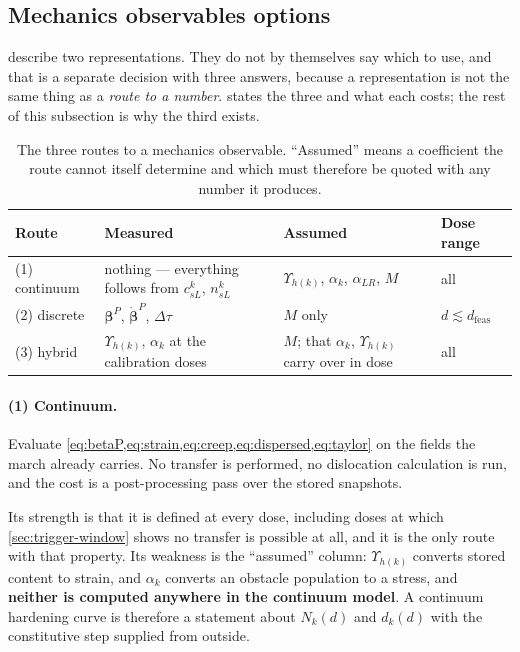 \documentclass{article}
\begin{document}
\subsection{Mechanics observables options}
\label{sec:obs-options}

 describe two representations. They do
not by themselves say which to use, and that is a separate decision with three
answers, because a representation is not the same thing as a \emph{route to a
number}.  states the three and what each costs; the rest of
this subsection is why the third exists.

\begin{table}[htbp]
\centering
\small
\caption{The three routes to a mechanics observable. ``Assumed'' means a
coefficient the route cannot itself determine and which must therefore be quoted
with any number it produces.}
\label{tab:obs-options}
\begin{tabularx}{\textwidth}{@{}l X X l@{}}
\toprule
Route & Measured & Assumed & Dose range \\
\midrule
(1) continuum &
nothing --- everything follows from $c^k_{sL}$, $n^k_{sL}$ &
$\Upsilon_{h(k)}$, $\alpha_k$, $\alpha_{LR}$, $M$ &
all \\
\addlinespace
(2) discrete &
$\bm\beta^{P}$, $\dot{\bm\beta}^{P}$, $\Delta\tau$ &
$M$ only &
$d\lesssim d_{\mathrm{feas}}$ \\
\addlinespace
(3) hybrid &
$\Upsilon_{h(k)}$, $\alpha_k$ at the calibration doses &
$M$; that $\alpha_k$, $\Upsilon_{h(k)}$ carry over in dose &
all \\
\bottomrule
\end{tabularx}
\end{table}

\paragraph{(1) Continuum.} Evaluate \cref{eq:betaP,eq:strain,eq:creep,eq:dispersed,eq:taylor}
on the fields the march already carries. No transfer is performed, no
dislocation calculation is run, and the cost is a post-processing pass over the
stored snapshots.

Its strength is that it is defined at every dose, including doses at which
\cref{sec:trigger-window} shows no transfer is possible at all, and it is the
only route with that property. Its weakness is the ``assumed'' column:
$\Upsilon_{h(k)}$ converts stored content to strain, and $\alpha_k$ converts an
obstacle population to a stress, and \textbf{neither is computed anywhere in the
continuum model}. A continuum hardening curve is therefore a statement about
$N_k(d)$ and $d_k(d)$ with the constitutive step supplied from outside.
\end{document}
